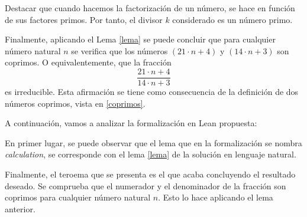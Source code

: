 Destacar que cuando hacemos la factorización de un número, se hace en
función de sus factores primos. Por tanto, el divisor \(k\) considerado
es un número primo.

Finalmente, aplicando el Lema \ref{lema} se puede concluir que para
cualquier número natural \(n\) se verifica que los números \( (21⋅n+4)\)
y \((14⋅n+3)\) son coprimos. O equivalentemente, que la fracción
\begin{equation*}
  \frac{21⋅n+4}{14⋅n+3}
\end{equation*}
es irreducible. Esta afirmación se tiene como consecuencia de la
definición de dos números coprimos, vista en \ref{coprimos}.

A continuación, vamos a analizar la formalización en Lean propuesta:


En primer lugar, se puede observar que el lema que en la
formalización se nombra \textit{calculation}, se corresponde con
el lema \ref{lema} de la solución en lenguaje natural.

Finalmente, el teroema que se presenta es el que acaba concluyendo
el resultado deseado. Se comprueba que el numerador y el denominador
de la fracción son coprimos para cualquier número natural \(n\).
Esto lo hace aplicando el lema anterior.

